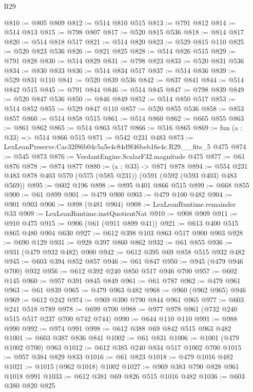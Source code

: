 \begin{lexlean}{R29}
\begin{coremodule}
@810 := @805 @809
@812 := @514 @810 @515
@813 := @791 @812
@814 := @514 @813
@815 := @798 @807
@817 := @520 @815 @536
@818 := @814 @817
@820 := @514 @818 @517
@821 := @514 @820
@823 := @529 @815 @110
@825 := @520 @823 @536
@826 := @821 @825
@828 := @514 @826 @515
@829 := @791 @828
@830 := @514 @829
@831 := @798 @823
@833 := @520 @831 @536
@834 := @830 @833
@836 := @514 @834 @517
@837 := @514 @836
@839 := @529 @831 @110
@841 := @520 @839 @536
@842 := @837 @841
@844 := @514 @842 @515
@845 := @791 @844
@846 := @514 @845
@847 := @798 @839
@849 := @520 @847 @536
@850 := @846 @849
@852 := @514 @850 @517
@853 := @514 @852
@855 := @529 @847 @110
@857 := @520 @855 @536
@858 := @853 @857
@860 := @514 @858 @515
@861 := @514 @860
@862 := @665 @855
@863 := @861 @862
@865 := @514 @863 @517
@866 := @516 @865
@869 := fun (a : @33) => @514 @866 @515
@871 := @542 @231 @483
@873 := LexLeanPreserve.Cac32f86b04c5a5e4c84d9f46beb16e4c.R29.__fits_5 @475
@874 := @545 @873
@876 := VerdantEngine.ScalarF32.magnitude @475
@877 := @61 @876
@878 := @874 @877
@880 := (a : @33) -> @871 @878
@894 := @554 @231 @483 @878 @403 @570 (@575 (@585 @231)) (@591 (@592 (@593 @403) @483 @569))
@895 := @602 @196
@898 := @895 @401 @866 @515
@899 := @668 @855
@900 := @61 @899
@901 := @479 @900
@903 := @479 @100 @482
@904 := @901 @903
@906 := @898 (@481 @904)
@908 := LexLeanRuntime.remainder @33
@909 := LexLeanRuntime.instQuotientNat
@910 := @908 @909
@911 := @910 @475
@915 := @906 (@61 (@911 @899 @41))
@921 := @613 @400 @515 @865 @480 @904 @630
@927 := @612 @398 @103 @863 @517 @900 @903
@928 := @690 @129
@931 := @928 @397 @860 @862
@932 := @61 @855
@936 := @931 (@479 @932 @482) @900
@942 := @612 @395 @69 @858 @515 @932 @482
@945 := @603 @394 @852 @857
@946 := @61 @847
@950 := @945 (@479 @946 @700) @932
@956 := @612 @392 @240 @850 @517 @946 @700
@957 := @602 @145
@960 := @957 @391 @845 @849
@961 := @61 @787
@962 := @479 @961
@963 := @61 @839
@965 := @479 @963 @482
@968 := @960 (@962 @965) @946
@969 := @612 @242
@974 := @969 @390 @790 @844 @961 @965
@977 := @603 @241 @518 @789
@978 := @699 @700
@988 := @977 @978 @961 (@732 @240 @515 @517 @237 @700 @742 @744)
@990 := @644 @110 @110
@991 := @988 @990
@992 := @974 @991
@998 := @612 @388 @69 @842 @515 @963 @482
@1001 := @603 @387 @836 @841
@1002 := @61 @831
@1006 := @1001 (@479 @1002 @700) @963
@1012 := @612 @385 @240 @834 @517 @1002 @700
@1015 := @957 @384 @829 @833
@1016 := @61 @823
@1018 := @479 @1016 @482
@1021 := @1015 (@962 @1018) @1002
@1027 := @969 @383 @790 @828 @961 @1018 @991
@1033 := @612 @381 @69 @826 @515 @1016 @482
@1036 := @603 @380 @820 @825

\end{coremodule}
\end{lexlean}
